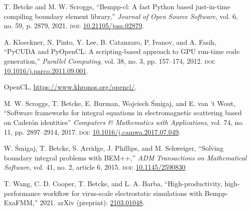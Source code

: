 \documentclass{IEEEcsmag}
\begin{document}

\begin{thebibliography}{1}

T. Betcke and M. W. Scroggs,
``Bempp-cl: A fast Python based just-in-time compiling boundary element library,''
{\it Journal of Open Source Software}, vol. 6, no. 59, p. 2879, 2021.
\textsc{doi}: \href{https://dx.doi.org/10.21105/joss.02879}{10.21105/joss.02879}.

A. Kloeckner, N. Pinto, Y. Lee, B. Catanzaro, P. Ivanov, and A. Fasih,
``PyCUDA and PyOpenCL: A scripting-based approach to GPU run-time code generation,''
{\it Parallel Computing}, vol. 38, no. 3, pp. 157--174, 2012.
\textsc{doi}: \href{https://dx.doi.org/10.1016/j.parco.2011.09.001}{10.1016/j.parco.2011.09.001}.

OpenCL, \url{https://www.khronos.org/opencl/}.


M. W. Scroggs, T. Betcke, E. Burman, Wojciech \'{S}migaj, and E. van 't Wout, ``Software frameworks for integral equations in electromagnetic scattering based on Cader\'{o}n identities''
{\it Computers \& Mathematics with Applications}, vol. 74, no. 11, pp. 2897--2914, 2017.
\textsc{doi}: \href{https://doi.org/10.1016/j.camwa.2017.07.049}{10.1016/j.camwa.2017.07.049}.

W. \'{S}migaj, T. Betcke, S. Arridge, J. Phillips, and M. Schweiger,
``Solving boundary integral problems with BEM++,''
{\it ADM Transactions on Mathematical Software}, vol. 41, no. 2, article 6, 2015.
\textsc{doi}: \href{https://doi.org/10.1145/2590830}{10.1145/2590830}
	
T. Wang, C. D. Cooper, T. Betcke, and L. A. Barba,
``High-productivity, high-performance workflow for virus-scale electrostatic simulations with Bempp-ExaFMM,''
2021.
arXiv (preprint): \href{https://arxiv.org/abs/2103.01048}{2103.01048}.
\end{thebibliography}
\end{document}
